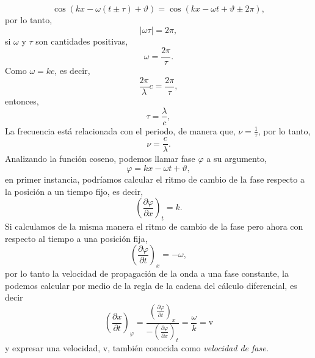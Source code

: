 \documentclass[11pt,fleqn]{book} %
\begin{document}
\begin{equation*}
 \cos(kx  -\omega (t\pm \tau )+\vartheta)=\cos(kx - \omega t+\vartheta\pm 2\pi),
\end{equation*}
por lo tanto,
\begin{equation*}
|\omega\tau|=2\pi,
\end{equation*}
si $\omega$ y $\tau$ son cantidades positivas,
\begin{equation*}
\omega=\frac{2\pi}{\tau}.
\end{equation*}
Como $\omega=kc$, es decir,
\begin{equation*}
\frac{2\pi}{\lambda}c=\frac{2\pi}{\tau},
\end{equation*}
entonces,
\begin{equation*}
\tau=\frac{\lambda}{c},
\end{equation*}
La frecuencia est\'a relacionada con el periodo, de manera que, $\nu=\frac{1}{\tau}$, por lo tanto,
\begin{equation}
 \nu=\frac{c}{\lambda}.
\end{equation}
Analizando la funci\'on coseno, podemos llamar fase $\varphi$ a su argumento,
\begin{equation}
\varphi=kx - \omega t+\vartheta,
\end{equation}
en primer instancia, podr\'iamos calcular el ritmo de cambio de la fase respecto a la posici\'on a un tiempo fijo,  es decir,
\begin{equation*}
\left(\frac{\partial \varphi}{\partial x}\right)_t=k.
\end{equation*}
Si calculamos de la misma manera el ritmo de cambio de la fase pero ahora con respecto al tiempo a una posici\'on fija,
\begin{equation*}
\left(\frac{\partial \varphi}{\partial t}\right)_x=-\omega,
\end{equation*}
por lo tanto la velocidad de propagaci\'on de la onda a una fase constante, la podemos calcular por medio de la regla de la cadena
del c\'alculo diferencial, es decir
\begin{equation}
\left(\frac{\partial x}{\partial t}\right)_{\varphi}  =\frac{\left(\frac{\partial \varphi}{\partial t}\right)_x}{-\left(\frac{\partial \varphi}{\partial x}\right)_t}= \frac{\omega}{k}= \text{v}
\end{equation}
y expresar una velocidad, v, tambi\'en conocida como \textit{velocidad de fase.}
\end{document}
